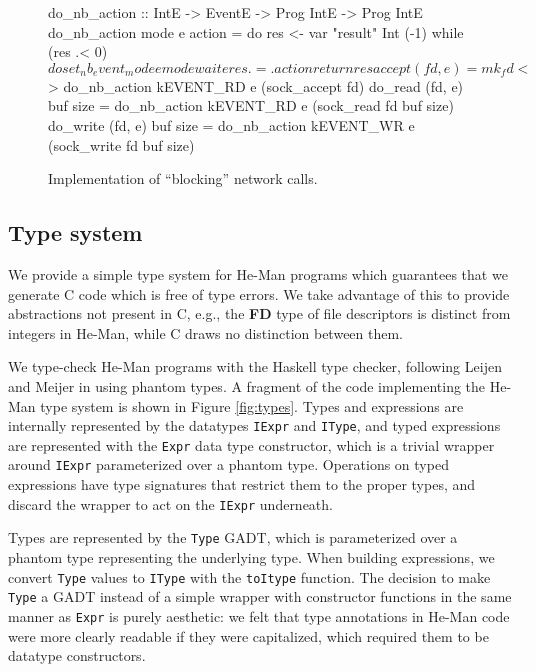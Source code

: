 \documentclass[preprint]{sigplanconf}
\renewcommand{\t}{\texttt}
\renewcommand{\b}{\textbf}
\begin{document}
\begin{figure}[ht]
\centering
\begin{code}
do_nb_action :: IntE -> EventE -> Prog IntE
                -> Prog IntE
do_nb_action mode e action = do
  res <- var "result" Int (-1)
  while (res .< 0) $ do
    set_nb_event_mode e mode
    wait e
    res .=. action
  return res

accept (fd, e) =
  mk_fd <$> do_nb_action kEVENT_RD e (sock_accept fd)
do_read (fd, e) buf size =
  do_nb_action kEVENT_RD e (sock_read fd buf size)
do_write (fd, e) buf size =
  do_nb_action kEVENT_WR e (sock_write fd buf size)
\end{code}
\caption{Implementation of ``blocking'' network calls.}
\label{fig:generic}
\end{figure}

\subsection{Type system}

We provide a simple type system for He-Man programs which guarantees that we
generate C code which is free of type errors. We take advantage of this to
provide abstractions not present in C, e.g., the \b{FD} type of file descriptors
is distinct from integers in He-Man, while C draws no distinction between them.

We type-check He-Man programs with the Haskell type checker, following Leijen
and Meijer \cite{LeijenMeijer} in using phantom types. A fragment of the code
implementing the He-Man type system is shown in Figure \ref{fig:types}. Types
and expressions are internally represented by the datatypes \t{IExpr} and
\t{IType}, and typed expressions are represented with the \t{Expr} data type
constructor, which is a trivial wrapper around \t{IExpr} parameterized
over a phantom type. Operations on typed expressions have type signatures that
restrict them to the proper types, and discard the wrapper to act on the
\t{IExpr} underneath.

Types are represented by the \t{Type} GADT, which is parameterized over a
phantom type representing the underlying type. When building expressions, we
convert \t{Type} values to \t{IType} with the \t{toItype} function. The decision
to make \t{Type} a GADT instead of a simple wrapper with constructor functions
in the same manner as \t{Expr} is purely aesthetic: we felt that type
annotations in He-Man code were more clearly readable if they were capitalized,
which required them to be datatype constructors.
\end{document}

